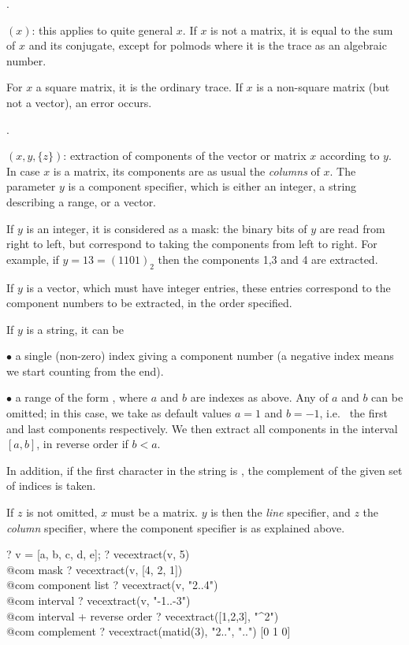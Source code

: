 .

$(x)$: this applies to quite general $x$. If $x$ is not a
matrix, it is equal to the sum of $x$ and its conjugate, except for polmods
where it is the trace as an algebraic number.

For $x$ a square matrix, it is the ordinary trace. If $x$ is a
non-square matrix (but not a vector), an error occurs.

.

$(x,y,\{z\})$: extraction of components of the
vector or matrix $x$ according to $y$. In case $x$ is a matrix, its
components are as usual the \emph{columns} of $x$. The parameter $y$ is a
component specifier, which is either an integer, a string describing a
range, or a vector.

If $y$ is an integer, it is considered as a mask: the binary bits of $y$ are
read from right to left, but correspond to taking the components from left to
right. For example, if $y=13=(1101)_2$ then the components 1,3 and 4 are
extracted.

If $y$ is a vector, which must have integer entries, these entries correspond
to the component numbers to be extracted, in the order specified.

If $y$ is a string, it can be

$\bullet$ a single (non-zero) index giving a component number (a negative
index means we start counting from the end).

$\bullet$ a range of the form , where $a$ and $b$ are
indexes as above. Any of $a$ and $b$ can be omitted; in this case, we take
as default values $a = 1$ and $b = -1$, i.e.~ the first and last components
respectively. We then extract all components in the interval $[a,b]$, in
reverse order if $b < a$.

In addition, if the first character in the string is \kbd{\pow}, the
complement of the given set of indices is taken.

If $z$ is not omitted, $x$ must be a matrix. $y$ is then the \emph{line}
specifier, and $z$ the \emph{column} specifier, where the component specifier
is as explained above.

\bprog
? v = [a, b, c, d, e];
? vecextract(v, 5)          \\@com mask
? vecextract(v, [4, 2, 1])  \\@com component list
? vecextract(v, "2..4")     \\@com interval
? vecextract(v, "-1..-3")   \\@com interval + reverse order
? vecextract([1,2,3], "^2") \\@com complement
? vecextract(matid(3), "2..", "..")
[0 1 0]

